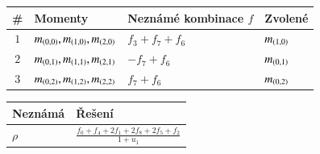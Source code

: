 \begin{table}[!h]
	\centering
	\begin{tabular}{c l l l}
		\toprule
		\# & Momenty & Neznámé kombinace $f$ & Zvolené\\
		\midrule
		\multirow{ 1}{*}{$1$} & \multirow{ 1}{*}{$m_{\left(0,0\right)}, m_{\left(1,0\right)}, m_{\left(2,0\right)}$} & $f_3+f_7+f_6$ & \multirow{ 1}{*}{$m_{\left(1,0\right)}$}\\ 
		\midrule
		\multirow{ 1}{*}{$2$} & \multirow{ 1}{*}{$m_{\left(0,1\right)}, m_{\left(1,1\right)}, m_{\left(2,1\right)}$} & $-f_7+f_6$ & \multirow{ 1}{*}{$m_{\left(0,1\right)}$}\\ 
		\midrule
		\multirow{ 1}{*}{$3$} & \multirow{ 1}{*}{$m_{\left(0,2\right)}, m_{\left(1,2\right)}, m_{\left(2,2\right)}$} & $f_7+f_6$ & \multirow{ 1}{*}{$m_{\left(0,2\right)}$}\\ 
		\bottomrule
\end{tabular}\end{table}

\begin{table}[!h]
	\centering
	\begin{tabular}{l l}
		\toprule
		Neznámá & Řešení\\
		\midrule
		$\rho$ & $\frac{f_0+f_4+2 f_1+2 f_8+2 f_5+f_2}{1+u_1}$ \\ 
		\bottomrule
\end{tabular}\end{table}

